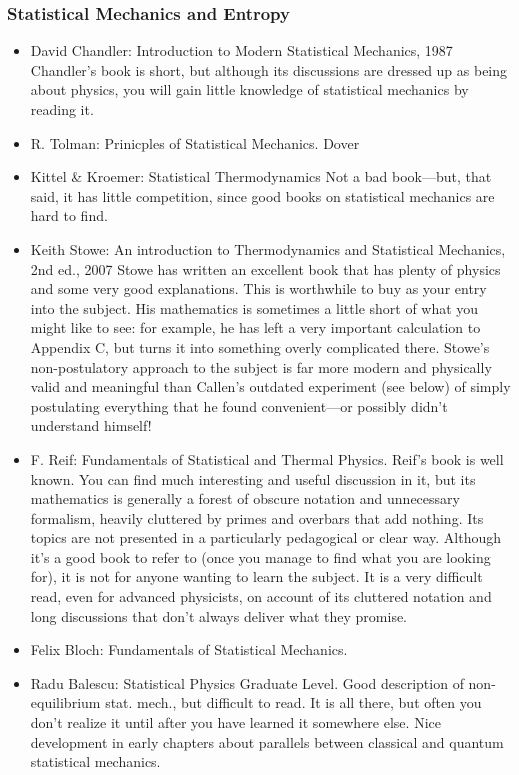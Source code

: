 \documentclass[10pt,a4paper]{book}
\theoremstyle{definition}
\begin{document}
\subsubsection{Statistical Mechanics and Entropy}

\begin{itemize}
\item David Chandler: Introduction to Modern Statistical Mechanics, 1987
Chandler's book is short, but although its discussions are dressed up as being about physics, you will gain little knowledge of statistical mechanics by reading it.
\item R. Tolman: Prinicples of Statistical Mechanics. Dover
\item Kittel \& Kroemer: Statistical Thermodynamics
Not a bad book—but, that said, it has little competition, since good books on statistical mechanics are hard to find.
\item Keith Stowe: An introduction to Thermodynamics and Statistical Mechanics, 2nd ed., 2007
Stowe has written an excellent book that has plenty of physics and some very good explanations.  This is worthwhile to buy as your entry into the subject.  His mathematics is sometimes a little short of what you might like to see: for example, he has left a very important calculation to Appendix C, but turns it into something overly complicated there.  Stowe's non-postulatory approach to the subject is far more modern and physically valid and meaningful than Callen's outdated experiment (see below) of simply postulating everything that he found convenient—or possibly didn't understand himself!
\item F. Reif: Fundamentals of Statistical and Thermal Physics.
Reif's book is well known.  You can find much interesting and useful discussion in it, but its mathematics is generally a forest of obscure notation and unnecessary formalism, heavily cluttered by primes and overbars that add nothing.  Its topics are not presented in a particularly pedagogical or clear way.  Although it's a good book to refer to (once you manage to find what you are looking for), it is not for anyone wanting to learn the subject.  It is a very difficult read, even for advanced physicists, on account of its cluttered notation and long discussions that don't always deliver what they promise.
\item Felix Bloch: Fundamentals of Statistical Mechanics.
\item Radu Balescu: Statistical Physics
Graduate Level.  Good description of non-equilibrium stat. mech., but difficult to read.  It is all there, but often you don't realize it until after you have learned it somewhere else.  Nice development in early chapters about parallels between classical and quantum statistical mechanics.

\end{itemize}
\end{document}
